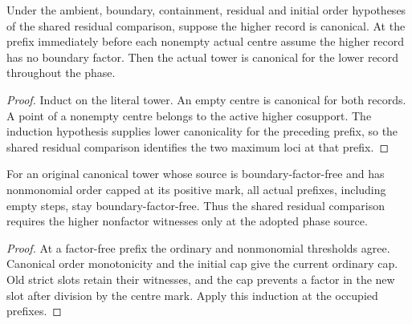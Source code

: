 \begin{theorem}
\label{hir:g8-shared-residual-stage-canonical}
\leanok
Under the ambient, boundary, containment, residual and initial
order hypotheses of the shared residual comparison, suppose the
higher record is canonical. At the prefix immediately before
each nonempty actual centre assume the higher record has no
boundary factor. Then the actual tower is canonical for the
lower record throughout the phase.
\end{theorem}
\begin{proof}
Induct on the literal tower. An empty centre is canonical for
both records. A point of a nonempty centre belongs to the active
higher cosupport. The induction hypothesis supplies lower
canonicality for the preceding prefix, so the shared residual
comparison identifies the two maximum loci at that prefix.
\end{proof}

\begin{theorem}
\label{hir:g8-shared-residual-initial-factor-free}
\leanok
For an original canonical tower whose source is boundary-factor-free
and has nonmonomial order capped at its positive mark, all actual
prefixes, including empty steps, stay boundary-factor-free. Thus
the shared residual comparison requires the higher nonfactor
witnesses only at the adopted phase source.
\end{theorem}
\begin{proof}
At a factor-free prefix the ordinary and nonmonomial thresholds
agree. Canonical order monotonicity and the initial cap give the
current ordinary cap. Old strict slots retain their witnesses,
and the cap prevents a factor in the new slot after division
by the centre mark. Apply this induction at the occupied prefixes.
\end{proof}

